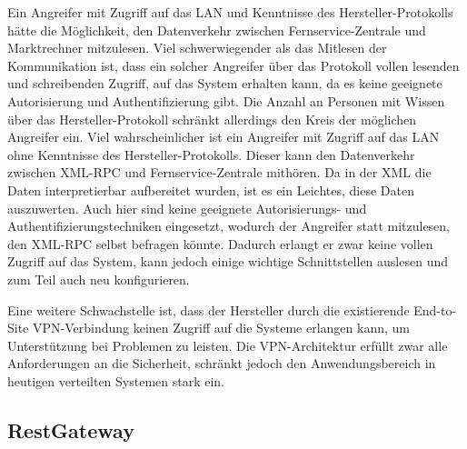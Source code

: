 \documentclass[11pt,a4paper]{report}
\begin{document}
Ein Angreifer mit Zugriff auf das LAN und Kenntnisse des Hersteller-Protokolls hätte die Möglichkeit, den Datenverkehr zwischen Fernservice-Zentrale und Marktrechner mitzulesen. Viel schwerwiegender als das Mitlesen der Kommunikation ist, dass ein solcher Angreifer über das Protokoll vollen lesenden und schreibenden Zugriff, auf das System erhalten kann, da es keine geeignete Autorisierung und Authentifizierung gibt. Die Anzahl an Personen mit Wissen über das Hersteller-Protokoll schränkt allerdings den Kreis der möglichen Angreifer ein. Viel wahrscheinlicher ist ein Angreifer mit Zugriff auf das LAN ohne Kenntnisse des Hersteller-Protokolls. Dieser kann den Datenverkehr zwischen XML-RPC und Fernservice-Zentrale mithören. Da in der XML die Daten interpretierbar aufbereitet wurden, ist es ein Leichtes, diese Daten auszuwerten. Auch hier sind keine geeignete Autorisierungs- und Authentifizierungstechniken eingesetzt, wodurch der Angreifer statt mitzulesen, den XML-RPC selbst befragen könnte. Dadurch erlangt er zwar keine vollen Zugriff auf das System, kann jedoch einige wichtige Schnittstellen auslesen und zum Teil auch neu konfigurieren. 

Eine weitere Schwachstelle ist, dass der Hersteller durch die existierende End-to-Site VPN-Verbindung keinen Zugriff auf die Systeme erlangen kann, um Unterstützung bei Problemen zu leisten. Die VPN-Architektur erfüllt zwar alle Anforderungen an die Sicherheit, schränkt jedoch den Anwendungsbereich in heutigen verteilten Systemen stark ein.

\subsection{RestGateway} 
\end{document}
